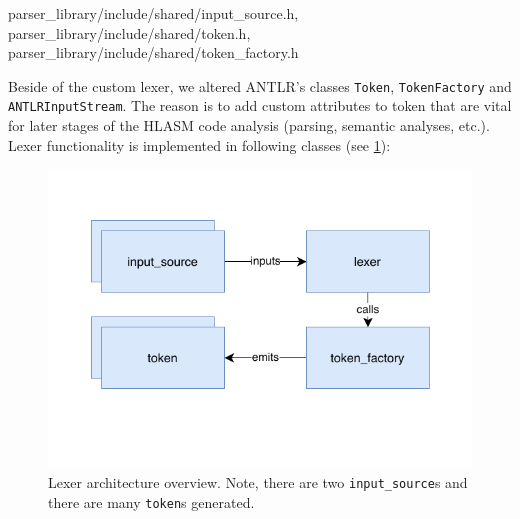 {parser\_library/include/shared/input\_source.h,
parser\_library/include/shared/token.h,
parser\_library/include/shared/token\_factory.h}

Beside of the custom lexer, we altered ANTLR's classes \texttt{Token}, \texttt{TokenFactory} and \texttt{ANTLRInputStream}. The reason is to add custom attributes to token that are vital for later stages of the HLASM code analysis (parsing, semantic analyses, etc.). Lexer functionality is implemented in following classes (see \cref{lexer_arch}):

\begin{figure}
	\centering
	\includegraphics{img/lexer_arch}
	\caption{Lexer architecture overview. Note, there are two \texttt{input\_source}s and there are many \texttt{token}s
		\label{lexer_arch} generated.}
\end{figure}

